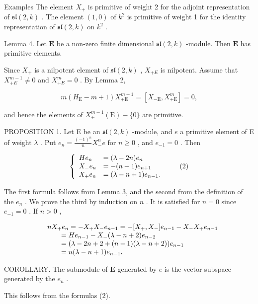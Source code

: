 Examples The element \(X_{+}\) is primitive of weight 2 for the adjoint representation of \(\mathfrak{sl}(2,k)\) . The element \((1,0)\) of \(k^{2}\) is primitive of weight 1 for the identity representation of \(\mathfrak{sl}(2,k)\) on \(k^{2}\) .

Lemma 4. Let \(\mathbf{E}\) be a non-zero finite dimensional \(\mathfrak{sl}(2,k)\) -module. Then \(\mathbf{E}\) has primitive elements.

Since \(X_{+}\) is a nilpotent element of \(\mathfrak{sl}(2,k)\) , \(X_{+E}\) is nilpotent. Assume that \(X_{+E}^{m-1} \neq 0\) and \(X_{+E}^{m} = 0\) . By Lemma 2,

\[
m (H _ {\mathrm{E}} - m + 1) X _ {+ \mathrm{E}} ^ {m - 1} = [ X _ {- \mathrm{E}}, X _ {+ \mathrm{E}} ^ {m} ] = 0,
\]

and hence the elements of \(X_{+}^{m - 1}(\mathrm{E}) - \{0\}\) are primitive.

PROPOSITION 1. Let E be an \(\mathfrak{sl}(2,k)\) -module, and \(e\) a primitive element of E of weight \(\lambda\) . Put \(e_n = \frac{(-1)^n}{n} X_-^n e\) for \(n \geq 0\) , and \(e_{-1} = 0\) . Then

\[
\left\{ \begin{array}{l l} H e _ {n} & = (\lambda - 2 n) e _ {n} \\ X _ {-} e _ {n} & = - (n + 1) e _ {n + 1} \\ X _ {+} e _ {n} & = (\lambda - n + 1) e _ {n - 1}. \end{array} \right.\tag{2}
\]

The first formula follows from Lemma 3, and the second from the definition of the \(e_n\) . We prove the third by induction on \(n\) . It is satisfied for \(n = 0\) since \(e_{-1} = 0\) . If \(n > 0\) ,

\[
\begin{array}{r l} & n X _ {+} e _ {n} = - X _ {+} X _ {-} e _ {n - 1} = - [ X _ {+}, X _ {-} ] e _ {n - 1} - X _ {-} X _ {+} e _ {n - 1} \\ & \qquad = H e _ {n - 1} - X _ {-} (\lambda - n + 2) e _ {n - 2} \\ & \qquad = (\lambda - 2 n + 2 + (n - 1) (\lambda - n + 2)) e _ {n - 1} \\ & \qquad = n (\lambda - n + 1) e _ {n - 1}. \end{array}
\]

COROLLARY. The submodule of \(\mathbf{E}\) generated by \(e\) is the vector subspace generated by the \(e_n\) .

This follows from the formulas (2).

